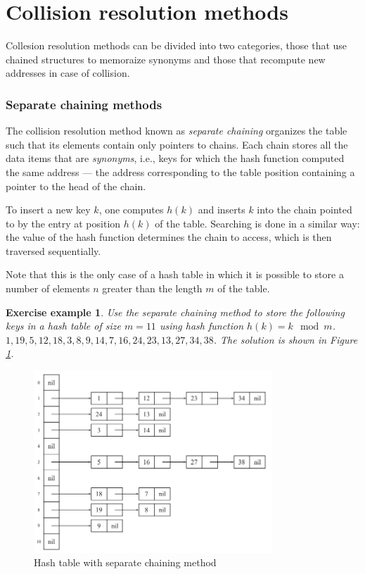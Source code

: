 \documentclass{report}
\newtheorem{es}{Exercise example}[chapter]
\begin{document}
\section{Collision resolution methods}
Collesion resolution methods can be divided into two categories, those that use chained structures to memoraize synonyms and those that recompute new addresses in case of collision.
\subsubsection{Separate chaining methods}
The collision resolution method known as \textit{separate chaining} organizes the table such that its elements contain only pointers to chains. Each chain stores all the data items that are \textit{synonyms}, i.e., keys for which the hash function computed the same address — the address corresponding to the table position containing a pointer to the head of the chain.

To insert a new key $k$, one computes $h(k)$ and inserts $k$ into the chain pointed to by the entry at position $h(k)$ of the table. Searching is done in a similar way: the value of the hash function determines the chain to access, which is then traversed sequentially.

Note that this is the only case of a hash table in which it is possible to store a number of elements $n$ greater than the length $m$ of the table.
\begin{es}
    Use the separate chaining method to store the following keys in a hash table of size \(m=11\) using hash function \(h(k) = k \mod m\). \(1, 19, 5, 12, 18, 3, 8, 9, 14, 7, 16, 24, 23, 13, 27, 34, 38\). The solution is shown in Figure \ref{fig:hash_table}.
\end{es}
\begin{figure}
    \centering
    \includegraphics[width=0.8\textwidth]{img/hash_separata.PNG}
    \caption{Hash table with separate chaining method}
    \label{fig:hash_table}
\end{figure}
\end{document}
